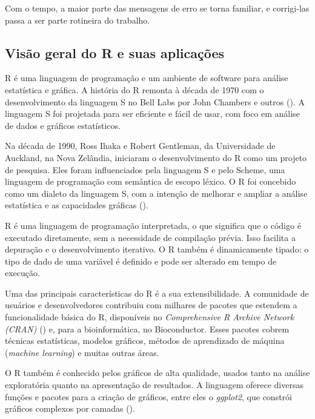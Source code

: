 \documentclass[
]{book}
\begin{document}
Com o tempo, a maior parte das mensagens de erro se torna familiar, e corrigi-las passa a ser parte rotineira do trabalho.

\subsection{Visão geral do R e suas aplicações}\label{visuxe3o-geral-do-r-e-suas-aplicauxe7uxf5es}

R é uma linguagem de programação e um ambiente de software para análise estatística e gráfica. A história do R remonta à década de 1970 com o desenvolvimento da linguagem S no Bell Labs por John Chambers e outros (). A linguagem S foi projetada para ser eficiente e fácil de usar, com foco em análise de dados e gráficos estatísticos.

Na década de 1990, Ross Ihaka e Robert Gentleman, da Universidade de Auckland, na Nova Zelândia, iniciaram o desenvolvimento do R como um projeto de pesquisa. Eles foram influenciados pela linguagem S e pelo Scheme, uma linguagem de programação com semântica de escopo léxico. O R foi concebido como um dialeto da linguagem S, com a intenção de melhorar e ampliar a análise estatística e as capacidades gráficas ().

R é uma linguagem de programação interpretada, o que significa que o código é executado diretamente, sem a necessidade de compilação prévia. Isso facilita a depuração e o desenvolvimento iterativo. O R também é dinamicamente tipado: o tipo de dado de uma variável é definido e pode ser alterado em tempo de execução.

Uma das principais características do R é a sua extensibilidade. A comunidade de usuários e desenvolvedores contribuiu com milhares de pacotes que estendem a funcionalidade básica do R, disponíveis no \emph{Comprehensive R Archive Network (CRAN)} () e, para a bioinformática, no Bioconductor. Esses pacotes cobrem técnicas estatísticas, modelos gráficos, métodos de aprendizado de máquina (\emph{machine learning}) e muitas outras áreas.

O R também é conhecido pelos gráficos de alta qualidade, usados tanto na análise exploratória quanto na apresentação de resultados. A linguagem oferece diversas funções e pacotes para a criação de gráficos, entre eles o \emph{ggplot2}, que constrói gráficos complexos por camadas ().
\end{document}
